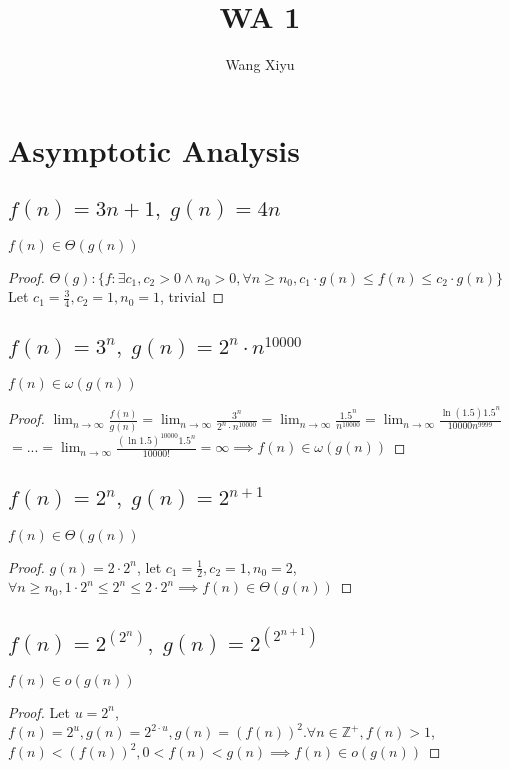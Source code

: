\documentclass{article}
\begin{document}
\title{WA 1}
\author{Wang Xiyu}
\date{}
\maketitle

\section{Asymptotic Analysis}
\subsection{$f(n) = 3n + 1,\; g(n) = 4n$}
$f(n) \in \Theta(g(n))$
\begin{proof}
    $\Theta(g): \{f: \exists c_1, c_2 > 0 \land n_0 > 0, \forall n \geq n_0, c_1 \cdot g(n) \leq f(n) \leq c_2 \cdot g(n)\}$ \\

    Let $c_1 = \frac{3}{4}, c_2 = 1, n_0 = 1$, trivial
\end{proof}
\subsection{$f(n) = 3^n,\; g(n) = 2^n \cdot n^{10000}$}
$f(n) \in \omega(g(n))$
\begin{proof}
    $\lim_{n \rightarrow \infty} \frac{f(n)}{g(n)} = \lim_{n \rightarrow \infty}
     \frac{3^n}{2^n \cdot n^{10000}} = \lim_{n \rightarrow \infty} \frac{1.5^n}{n^{10000}} 
     = \lim_{n \rightarrow \infty} \frac{\ln(1.5)1.5^n}{10000n^{9999}}$\\
     $= ... = \lim_{n \rightarrow \infty} \frac{(\ln 1.5)^{10000}1.5^n}{10000!} = \infty \implies f(n) \in \omega(g(n))$
\end{proof}
\subsection{$f(n) = 2^n,\; g(n) = 2^{n+1}$}
$f(n) \in \Theta(g(n))$
\begin{proof}
    $g(n) = 2\cdot 2^n$, let $c_1 = \frac{1}{2}, c_2 = 1, n_0 = 2$, \\
    $\forall n \geq n_0, 1 \cdot 2^n \leq 2^n \leq 2\cdot 2^n \implies f(n) \in \Theta(g(n))$
\end{proof}
\subsection{$f(n) = 2^{(2^n)},\; g(n) = 2^{(2^{n+1})}$}
$f(n) \in o(g(n))$
\begin{proof}
    Let $u = 2^n$, $f(n) = 2^u, g(n) = 2^{2\cdot u}, g(n) = (f(n))^2. \forall n \in \mathbb{Z}^+, f(n) > 1$,\\
    $f(n) < (f(n))^2, 0 < f(n) < g(n) \implies f(n) \in o(g(n))$
\end{proof}
\end{document}
